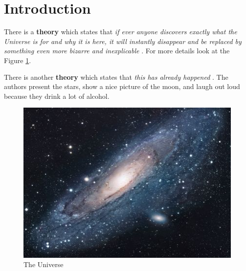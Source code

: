 \section{Introduction}
There is a \textbf{theory} which states that \textit{if ever anyone discovers exactly what the Universe is for and why it is here, it will instantly disappear and be replaced by something even more bizarre and inexplicable} \cite{miller90introduction}. For more details look at the Figure \ref{fig:universe}.

There is another \textbf{theory} which states that \textit{this has already happened} \cite{aberer03chatty}. The authors present the stars, show a nice picture of the moon, and laugh out loud because they drink a lot of alcohol.


\begin{figure}[h!]
\centering
\includegraphics[scale=1.7]{universe}
\caption{The Universe}
\label{fig:universe}
\end{figure}